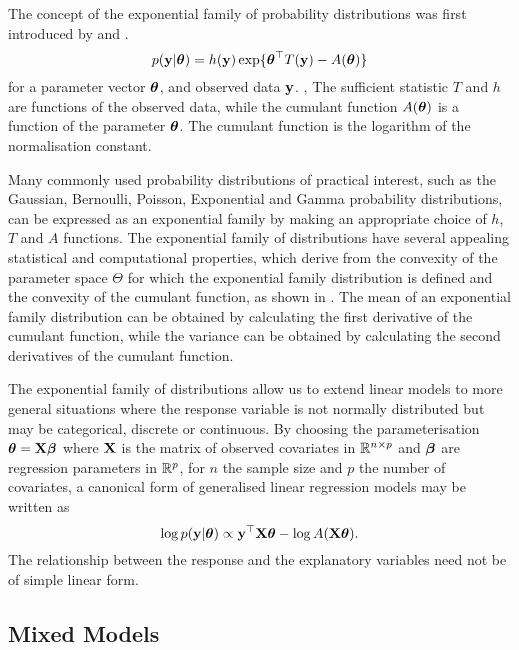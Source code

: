 The concept of the exponential family of probability distributions was first introduced by \cite{Koopman1935}
and \cite{pitman_1936}. 
\begin{equation}
	p({\bf y} | {\boldsymbol \theta}) = h({\bf y}) \exp \{ {\boldsymbol \theta}^\top T({\bf y}) - A({\boldsymbol \theta}) \}
\end{equation}
for a parameter vector ${\boldsymbol \theta}$, and observed data ${\bf y}$. , The sufficient statistic $T$ and $h$ are
functions of the observed data, while the cumulant function $A({\boldsymbol \theta})$ is a function of the parameter
${\boldsymbol \theta}$. The cumulant function is the logarithm of the normalisation constant.

Many commonly used probability distributions of practical interest, such as the Gaussian, Bernoulli, Poisson,
Exponential and Gamma probability distributions, can be expressed as an exponential family by making an
appropriate choice of $h$, $T$ and $A$ functions. The exponential family of distributions have several
appealing statistical and computational properties, which derive from the convexity of the parameter space
$\Theta$ for which the exponential family distribution is defined and the convexity of the cumulant function,
as shown in \cite{Jordan2010}. The mean of an exponential family distribution can be obtained by calculating
the first derivative of the cumulant function, while the variance can be obtained by calculating the second
derivatives of the cumulant function.

The exponential family of distributions allow us to extend linear models to more general situations where the
response variable is not normally distributed but may be categorical, discrete or continuous.  By choosing the
parameterisation ${\boldsymbol \theta} = {\bf X} {\boldsymbol \beta}$ where ${\bf X}$ is the matrix of observed covariates in ${\mathbb{R}}^{n \times p}$
and ${\boldsymbol \beta}$ are regression parameters in ${\mathbb{R}}^p$, for $n$ the sample size and $p$ the number of covariates, a
canonical form of generalised linear regression models may be written as
\begin{equation}
	\log p({\bf y} | {\boldsymbol \theta}) \propto {\bf y}^\top {\bf X} {\boldsymbol\theta} - \log A({\bf X} {\boldsymbol \theta}).
\end{equation}
The relationship between the response and the explanatory variables need not be of simple linear form.

\subsection{Mixed Models}

